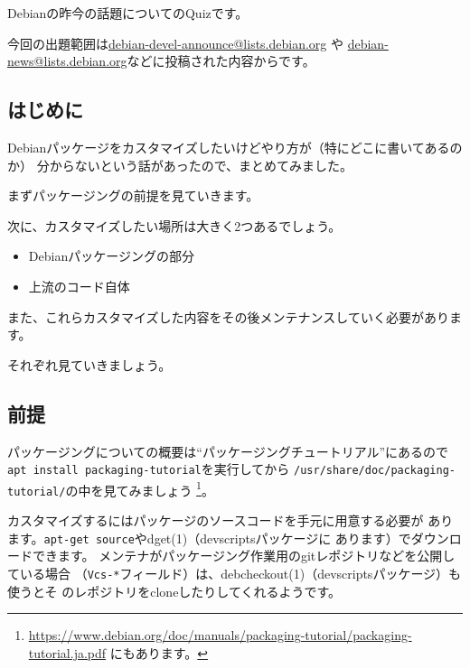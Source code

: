 \documentclass[mingoth,a4paper]{jsarticle}
\begin{document}

Debianの昨今の話題についてのQuizです。

今回の出題範囲は\url{debian-devel-announce@lists.debian.org} や \url{debian-news@lists.debian.org}などに投稿された内容からです。

\begin{multicols}{2}

\end{multicols}




\subsection{はじめに}

Debianパッケージをカスタマイズしたいけどやり方が（特にどこに書いてあるのか）
分からないという話があったので、まとめてみました。

まずパッケージングの前提を見ていきます。

次に、カスタマイズしたい場所は大きく2つあるでしょう。

\begin{itemize}
 \item Debianパッケージングの部分
 \item 上流のコード自体
\end{itemize}

また、これらカスタマイズした内容をその後メンテナンスしていく必要があります。

それぞれ見ていきましょう。

\subsection{前提}
パッケージングについての概要は``パッケージングチュートリアル''にあるので
\verb|apt install packaging-tutorial|を実行してから
\verb|/usr/share/doc/packaging-tutorial/|の中を見てみましょう
\footnote{\url{https://www.debian.org/doc/manuals/packaging-tutorial/packaging-tutorial.ja.pdf}
にもあります。}。

カスタマイズするにはパッケージのソースコードを手元に用意する必要が
あります。\verb|apt-get source|やdget(1)（devscriptsパッケージに
あります）でダウンロードできます。
メンテナがパッケージング作業用のgitレポジトリなどを公開している場合
（\verb|Vcs-*|フィールド）は、debcheckout(1)（devscriptsパッケージ）も使うとそ
のレポジトリをcloneしたりしてくれるようです。
\end{document}
